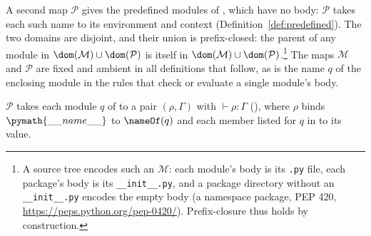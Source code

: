 A second map $\mathcal{P}$ gives the
predefined modules of , which have no body: $\mathcal{P}$ takes each such name to its
environment and context (Definition~\ref{def:predefined}). The two domains are disjoint, and their union is
prefix-closed: the parent of any module in $\dom(\mathcal{M}) \cup \dom(\mathcal{P})$ is itself in
$\dom(\mathcal{M}) \cup \dom(\mathcal{P})$.\footnote{A source tree encodes such an $\mathcal{M}$: each module's body is its \texttt{.py}
file, each package's body is its \texttt{\_\_init\_\_.py}, and a package directory without an
\texttt{\_\_init\_\_.py} encodes the empty body (a namespace package, PEP 420, \url{https://peps.python.org/pep-0420/}). Prefix-closure thus holds by
construction.} The maps $\mathcal{M}$ and $\mathcal{P}$ are fixed and ambient in all
definitions that follow, as is the name $q$ of the enclosing module in the rules that check or evaluate a single module's body.


\begin{definition}
\label{def:predefined}
$\mathcal{P}$ takes each module $q$ of  to a pair $(\rho, \Gamma)$ with $\vdash \rho :
\Gamma$ (), where $\rho$ binds $\pymath{\_\_name\_\_}$ to $\nameOf(q)$ and each
member listed for $q$ in  to its value.
\end{definition}


